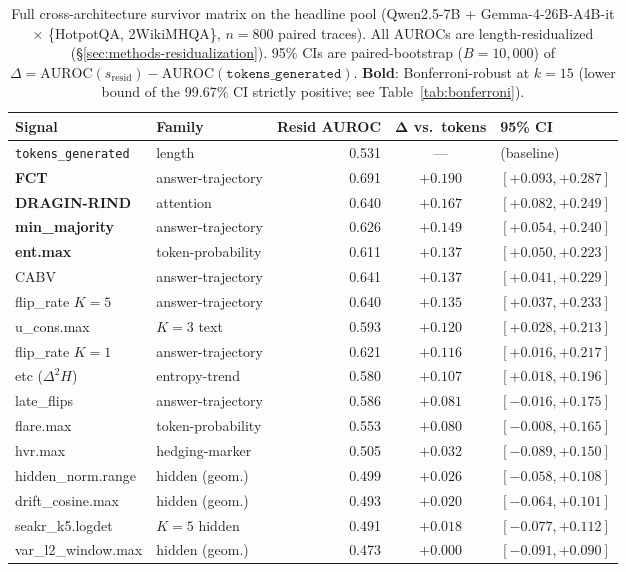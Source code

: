 \documentclass[11pt]{article}
\begin{document}
\begin{table}[t]
\centering\small
\begin{tabular}{@{}llrcl@{}}
\toprule
\textbf{Signal} & \textbf{Family} & \textbf{Resid AUROC} & $\boldsymbol{\Delta}$ \textbf{vs.\ tokens} & \textbf{95\% CI} \\
\midrule
\texttt{tokens\_generated} & length            & 0.531 & --- & (baseline) \\
\midrule
\textbf{FCT}              & answer-trajectory & 0.691 & $+0.190$ & $[+0.093, +0.287]$ \\
\textbf{DRAGIN-RIND}      & attention         & 0.640 & $+0.167$ & $[+0.082, +0.249]$ \\
\textbf{min\_majority}    & answer-trajectory & 0.626 & $+0.149$ & $[+0.054, +0.240]$ \\
\textbf{ent.max}          & token-probability & 0.611 & $+0.137$ & $[+0.050, +0.223]$ \\
CABV                      & answer-trajectory & 0.641 & $+0.137$ & $[+0.041, +0.229]$ \\
flip\_rate $K{=}5$        & answer-trajectory & 0.640 & $+0.135$ & $[+0.037, +0.233]$ \\
u\_cons.max               & $K{=}3$ text      & 0.593 & $+0.120$ & $[+0.028, +0.213]$ \\
flip\_rate $K{=}1$        & answer-trajectory & 0.621 & $+0.116$ & $[+0.016, +0.217]$ \\
etc ($\Delta^2 H$)        & entropy-trend     & 0.580 & $+0.107$ & $[+0.018, +0.196]$ \\
\midrule
late\_flips               & answer-trajectory & 0.586 & $+0.081$ & $[-0.016, +0.175]$ \\
flare.max                 & token-probability & 0.553 & $+0.080$ & $[-0.008, +0.165]$ \\
hvr.max    & hedging-marker    & 0.505 & $+0.032$ & $[-0.089, +0.150]$ \\
hidden\_norm.range        & hidden (geom.)    & 0.499 & $+0.026$ & $[-0.058, +0.108]$ \\
drift\_cosine.max         & hidden (geom.)    & 0.493 & $+0.020$ & $[-0.064, +0.101]$ \\
seakr\_k5.logdet          & $K{=}5$ hidden    & 0.491 & $+0.018$ & $[-0.077, +0.112]$ \\
var\_l2\_window.max       & hidden (geom.)    & 0.473 & $+0.000$ & $[-0.091, +0.090]$ \\
\bottomrule
\end{tabular}
\caption{Full cross-architecture survivor matrix on the headline pool (Qwen2.5-7B + Gemma-4-26B-A4B-it $\times$ \{HotpotQA, 2WikiMHQA\}, $n{=}800$ paired traces). All AUROCs are length-residualized (\S\ref{sec:methods-residualization}). 95\% CIs are paired-bootstrap ($B{=}10{,}000$) of $\Delta = \mathrm{AUROC}(s_{\text{resid}}) - \mathrm{AUROC}(\texttt{tokens\_generated})$. \textbf{Bold}: Bonferroni-robust at $k{=}15$ (lower bound of the 99.67\% CI strictly positive; see Table~\ref{tab:bonferroni}).}
\label{tab:hero-full}
\end{table}
\end{document}
